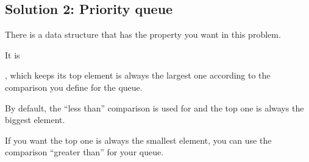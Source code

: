 \documentclass[letterpaper,12pt,english]{book}
\begin{document}
\subsection{Solution 2: Priority queue}
\label{\detokenize{Priority_Queue/703_Kth_Largest_Element_in_a_Stream:solution-2-priority-queue}}
\sphinxAtStartPar
There is a data structure that has the property you want in this problem.

\sphinxAtStartPar
It is %
\begin{footnote}[65]\sphinxAtStartFootnote
{}
%
\end{footnote}, which keeps its top element is always the largest one according to the comparison you define for the queue.

\sphinxAtStartPar
By default, the “less than” comparison is used for  and the top one is always the biggest element.

\sphinxAtStartPar
If you want the top one is always the smallest element, you can use the comparison “greater than” for your queue.
\end{document}

